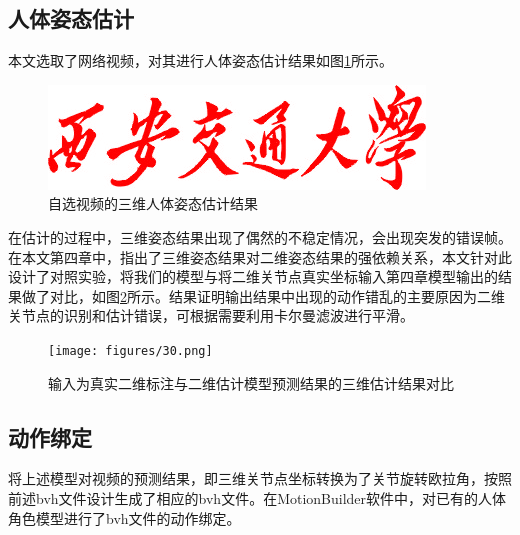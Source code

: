 \subsection{人体姿态估计}{}
本文选取了网络视频，对其进行人体姿态估计结果如图\ref{fig:f29}所示。
\begin{figure}[h]
	\centering
	\includegraphics[scale=0.4]{figures/XJTU_RED.png}
	\caption{自选视频的三维人体姿态估计结果}
	\label{fig:f29}
\end{figure}
在估计的过程中，三维姿态结果出现了偶然的不稳定情况，会出现突发的错误帧。在本文第四章中，指出了三维姿态结果对二维姿态结果的强依赖关系，本文针对此设计了对照实验，将我们的模型与将二维关节点真实坐标输入第四章模型输出的结果做了对比，如图\ref{fig:f30}所示。结果证明输出结果中出现的动作错乱的主要原因为二维关节点的识别和估计错误，可根据需要利用卡尔曼滤波进行平滑。
\begin{figure}[h]
	\centering
	\texttt{[image: figures/30.png]}
	\caption{输入为真实二维标注与二维估计模型预测结果的三维估计结果对比}
	\label{fig:f30}
\end{figure}

\subsection{动作绑定}{}
将上述模型对视频的预测结果，即三维关节点坐标转换为了关节旋转欧拉角，按照前述bvh文件设计生成了相应的bvh文件。在MotionBuilder软件中，对已有的人体角色模型进行了bvh文件的动作绑定。